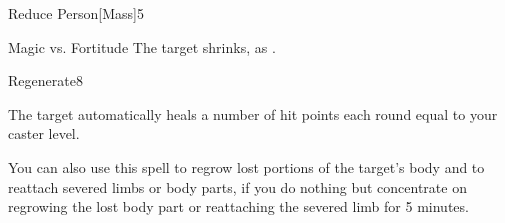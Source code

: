 \begin{spellsection}{Reduce Person}[Mass]{5}
\begin{spellheader}
\end{spellheader}
\begin{spellcontent}
    \begin{spelltargetinginfo}
    \end{spelltargetinginfo}
    \begin{spelleffects}
        \begin{spellattack}{Magic vs. Fortitude}
            \spellsuccess The target shrinks, as .
        \end{spellattack}
        \spelldur \durshort \dismissable
    \end{spelleffects}
\end{spellcontent}
\begin{spellfooter}
\end{spellfooter}
\end{spellsection}

\begin{spellsection}{Regenerate}{8}
\begin{spellheader}
\end{spellheader}
\begin{spellcontent}
    \begin{spelltargetinginfo}
    \end{spelltargetinginfo}
    \begin{spelleffects}
        \spelleffect The target automatically heals a number of hit points each round equal to your caster level.
        \par You can also use this spell to regrow lost portions of the target's body and to reattach severed limbs or body parts, if you do nothing but concentrate on regrowing the lost body part or reattaching the severed limb for 5 minutes.
        \spelldur \durshort
    \end{spelleffects}
\end{spellcontent}
\begin{spellfooter}
\end{spellfooter}
\end{spellsection}


